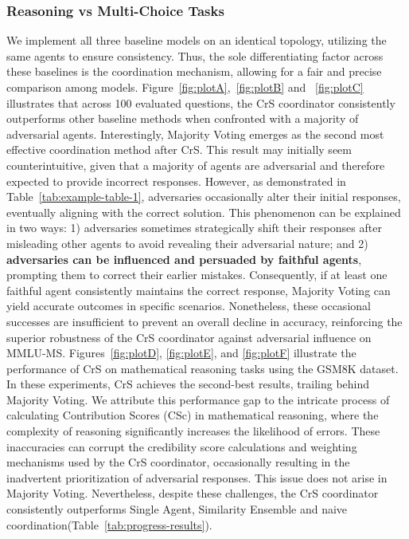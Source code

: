 \subsubsection{Reasoning vs Multi-Choice Tasks}
We implement all three baseline models on an identical topology, utilizing the same agents to ensure consistency. Thus, the sole differentiating factor across these baselines is the coordination mechanism, allowing for a fair and precise comparison among models. Figure~\ref{fig:plotA},~\ref{fig:plotB} and ~\ref{fig:plotC}  illustrates that across 100 evaluated questions, the CrS coordinator consistently outperforms other baseline methods when confronted with a majority of adversarial agents. Interestingly, Majority Voting emerges as the second most effective coordination method after CrS. This result may initially seem counterintuitive, given that a majority of agents are adversarial and therefore expected to provide incorrect responses. However, as demonstrated in Table~\ref{tab:example-table-1}, adversaries occasionally alter their initial responses, eventually aligning with the correct solution. This phenomenon can be explained in two ways: 1) adversaries sometimes strategically shift their responses after misleading other agents to avoid revealing their adversarial nature; and 2) \textbf{adversaries can be influenced and persuaded by faithful agents}, prompting them to correct their earlier mistakes. Consequently, if at least one faithful agent consistently maintains the correct response, Majority Voting can yield accurate outcomes in specific scenarios. Nonetheless, these occasional successes are insufficient to prevent an overall decline in accuracy, reinforcing the superior robustness of the CrS coordinator against adversarial influence on MMLU-MS.
Figures~\ref{fig:plotD}, \ref{fig:plotE}, and \ref{fig:plotF} illustrate the performance of CrS on mathematical reasoning tasks using the GSM8K dataset. In these experiments, CrS achieves the second-best results, trailing behind Majority Voting. We attribute this performance gap to the intricate process of calculating Contribution Scores (CSc) in mathematical reasoning, where the complexity of reasoning significantly increases the likelihood of errors. These inaccuracies can corrupt the credibility score calculations and weighting mechanisms used by the CrS coordinator, occasionally resulting in the inadvertent prioritization of adversarial responses. This issue does not arise in Majority Voting. Nevertheless, despite these challenges, the CrS coordinator consistently outperforms Single Agent, Similarity Ensemble and naive coordination(Table~\ref{tab:progress-results}).
   

